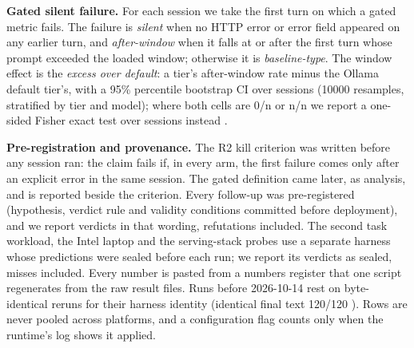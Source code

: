 \documentclass[conference,10pt]{IEEEtran}
\begin{document}
\textbf{Gated silent failure.} For each session we take the first turn on which a gated metric fails. The failure is \emph{silent} when no HTTP error or error field appeared on any earlier turn, and \emph{after-window} when it falls at or after the first turn whose prompt exceeded the loaded window; otherwise it is \emph{baseline-type}. The window effect is the \emph{excess over default}: a tier's after-window rate minus the Ollama default tier's, with a 95\% percentile bootstrap CI over sessions (10000 %
resamples, stratified by tier and model); where both cells are 0/n or n/n we report a one-sided Fisher exact test over sessions instead%
.

\textbf{Pre-registration and provenance.} The R2 kill criterion was written before any session ran: the claim fails if, in every arm, the first failure comes only after an explicit error in the same session. The gated definition came later, as analysis, and is reported beside the criterion. Every follow-up was pre-registered (hypothesis, verdict rule and validity conditions committed before deployment), and we report verdicts in that wording, refutations included. The second task workload, the Intel laptop and the serving-stack probes use a separate harness whose predictions were sealed before each run; we report its verdicts as sealed, misses included. Every number is pasted from a numbers register that one script regenerates from the raw result files. Runs before 2026-10-14 rest on byte-identical reruns for their harness identity (identical final text 120/120%
). Rows are never pooled across platforms, and a configuration flag counts only when the runtime's log shows it applied.
\end{document}
